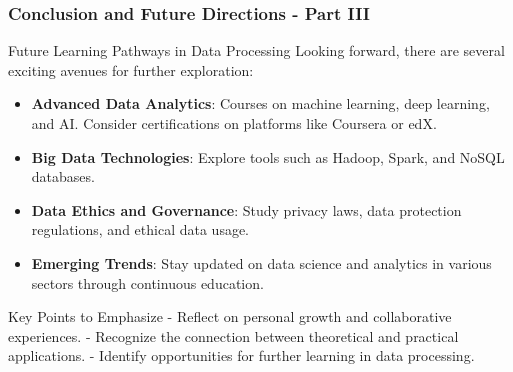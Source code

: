 \documentclass{beamer}
\begin{document}
\begin{frame}[fragile]
    \frametitle{Conclusion and Future Directions - Part III}
    \begin{block}{Future Learning Pathways in Data Processing}
        Looking forward, there are several exciting avenues for further exploration:
        \begin{itemize}
            \item \textbf{Advanced Data Analytics}: Courses on machine learning, deep learning, and AI. Consider certifications on platforms like Coursera or edX.
            \item \textbf{Big Data Technologies}: Explore tools such as Hadoop, Spark, and NoSQL databases.
            \item \textbf{Data Ethics and Governance}: Study privacy laws, data protection regulations, and ethical data usage.
            \item \textbf{Emerging Trends}: Stay updated on data science and analytics in various sectors through continuous education.
        \end{itemize}
    \end{block}

    \begin{block}{Key Points to Emphasize}
        - Reflect on personal growth and collaborative experiences.
        - Recognize the connection between theoretical and practical applications.
        - Identify opportunities for further learning in data processing.
    \end{block}
\end{frame}
\end{document}
